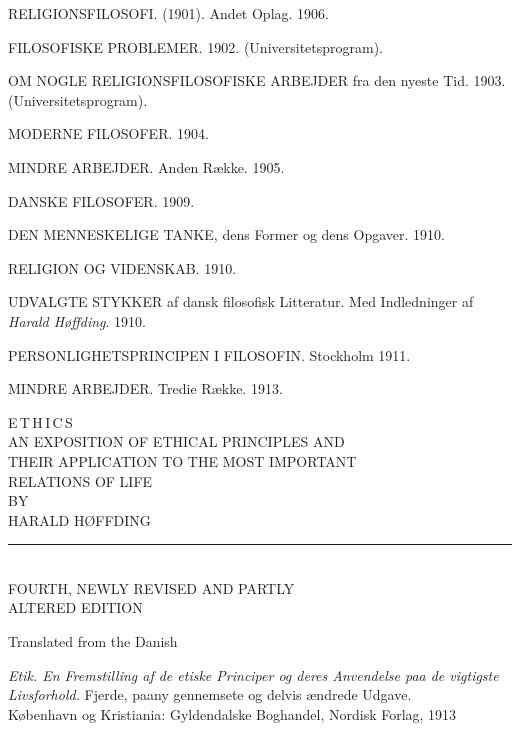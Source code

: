 \documentclass[12pt,a4paper,openany]{book}
\begin{document}
{RELIGIONSFILOSOFI. (1901). Andet Oplag. 1906.

FILOSOFISKE PROBLEMER. 1902. (Universitetsprogram).

OM NOGLE RELIGIONSFILOSOFISKE ARBEJDER fra den nyeste Tid. 1903. (Universitetsprogram).

MODERNE FILOSOFER. 1904.

MINDRE ARBEJDER. Anden Række. 1905.

DANSKE FILOSOFER. 1909.

DEN MENNESKELIGE TANKE, dens Former og dens Opgaver. 1910.

RELIGION OG VIDENSKAB. 1910.

UDVALGTE STYKKER af dansk filosofisk Litteratur. Med Indledninger af \textit{Harald Høffding}. 1910.

PERSONLIGHETSPRINCIPEN I FILOSOFIN. Stockholm 1911.

MINDRE ARBEJDER. Tredie Række. 1913.\par}
\clearpage

\begin{titlepage}
\begin{center}
\vspace*{2em}
{\fontsize{48}{52}\selectfont E\,T\,H\,I\,C\,S}\\[18pt]
{\large AN EXPOSITION OF ETHICAL PRINCIPLES AND\\
THEIR APPLICATION TO THE MOST IMPORTANT\\
RELATIONS OF LIFE}\\[24pt]
{\scriptsize BY}\\[12pt]
{\LARGE HARALD HØFFDING}\\[10pt]
\rule{2.5cm}{0.4pt}\\[14pt]
{\small FOURTH, NEWLY REVISED AND PARTLY\\
ALTERED EDITION}

\vfill
{\small Translated from the Danish}

\vfill
{\small \textit{Etik. En Fremstilling af de etiske Principer og deres Anvendelse paa de vigtigste
Livsforhold.} Fjerde, paany gennemsete og delvis ændrede Udgave.\\
København og Kristiania: Gyldendalske Boghandel, Nordisk Forlag, 1913}
\end{center}
\end{titlepage}

\pagestyle{fancy}

\end{document}
